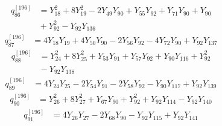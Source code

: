 \begin{equation}\label{q196:row:086}
\begin{aligned}
q_{86}^{[196]} &={} Y_{18}^{2} + 8Y_{19}^{2} - 2Y_{49}Y_{90} + Y_{55}Y_{92} + Y_{71}Y_{90} + Y_{90}\\
&{} + Y_{92}^{2} - Y_{92}Y_{136}
\end{aligned}
\end{equation}
\begin{equation}\label{q196:row:087}
\begin{aligned}
q_{87}^{[196]} &={} 4Y_{18}Y_{19} + 4Y_{50}Y_{90} - 2Y_{56}Y_{92} - 4Y_{72}Y_{90} + Y_{92}Y_{137}
\end{aligned}
\end{equation}
\begin{equation}\label{q196:row:088}
\begin{aligned}
q_{88}^{[196]} &={} Y_{24}^{2} + 8Y_{25}^{2} + Y_{53}Y_{91} + Y_{57}Y_{92} + Y_{90}Y_{116} + Y_{92}^{2}\\
&{} - Y_{92}Y_{138}
\end{aligned}
\end{equation}
\begin{equation}\label{q196:row:089}
\begin{aligned}
q_{89}^{[196]} &={} 4Y_{24}Y_{25} - 2Y_{54}Y_{91} - 2Y_{58}Y_{92} - Y_{90}Y_{117} + Y_{92}Y_{139}
\end{aligned}
\end{equation}
\begin{equation}\label{q196:row:090}
\begin{aligned}
q_{90}^{[196]} &={} Y_{26}^{2} + 8Y_{27}^{2} + Y_{67}Y_{90} + Y_{92}^{2} + Y_{92}Y_{114} - Y_{92}Y_{140}
\end{aligned}
\end{equation}
\begin{equation}\label{q196:row:091}
\begin{aligned}
q_{91}^{[196]} &={} 4Y_{26}Y_{27} - 2Y_{68}Y_{90} - Y_{92}Y_{115} + Y_{92}Y_{141}
\end{aligned}
\end{equation}
